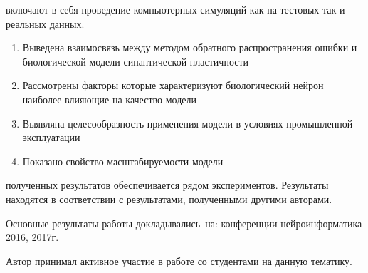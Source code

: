 {\methods} включают в себя проведение компьютерных симуляций как на тестовых так и реальных данных.

{}
\begin{enumerate}
  \item Выведена взаимосвязь между методом обратного распространения ошибки и биологической модели синаптической пластичности
  \item Рассмотрены факторы которые характеризуют биологический нейрон наиболее влияющие на качество модели
  \item Выявляна целесообразность применения модели в условиях промышленной эксплуатации
  \item Показано свойство масштабируемости модели
\end{enumerate}

{\reliability} полученных результатов обеспечивается рядом экспериментов. Результаты находятся в соответствии с результатами, полученными другими авторами.


{\probation}
Основные результаты работы докладывались~на: конференции нейроинформатика 2016, 2017г.

{\contribution} Автор принимал активное участие в работе со студентами на данную тематику.



